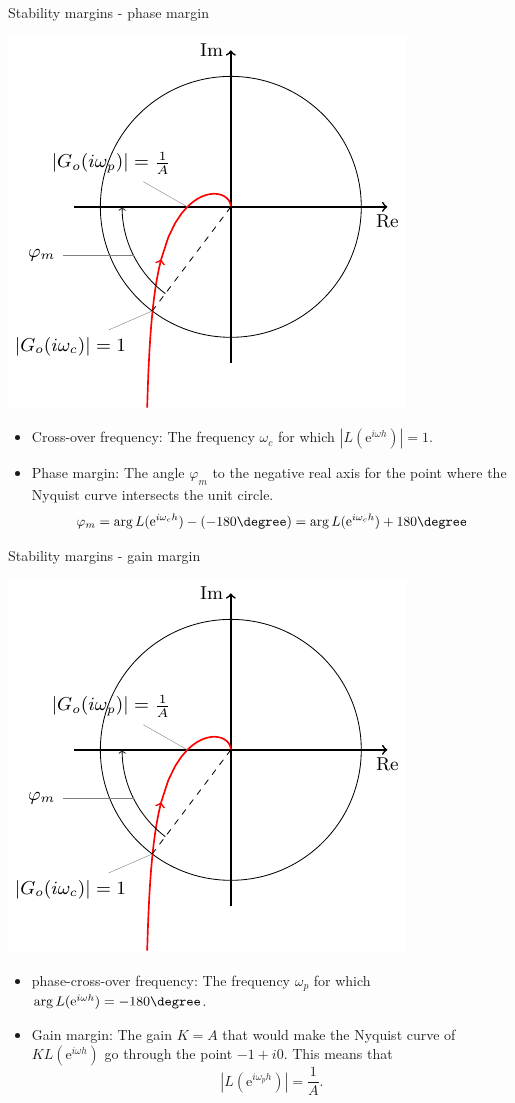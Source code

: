 \documentclass[presentation,aspectratio=169]{beamer}
\begin{document}
\begin{frame}[label={sec:org75821a8}]{Stability margins - phase margin}
\begin{center}
\includegraphics[width=0.38\linewidth]{../../figures/implane-nyquist-margins}
\end{center}
\begin{itemize}
\item Cross-over frequency: The frequency \(\omega_c\) for which \(|L(\mathrm{e}^{i\omega h})| = 1\).
\item Phase margin: The angle \(\varphi_m\) to the negative real axis for the point where the Nyquist curve intersects the unit circle. \[\varphi_m = \arg L(\mathrm{e}^{i\omega_c h}) - (-180\degree) = \arg L(\mathrm{e}^{i\omega_c h}) + 180\degree\]
\end{itemize}
\end{frame}

\begin{frame}[label={sec:orgb16d58a}]{Stability margins - gain margin}
\begin{center}
\includegraphics[width=0.34\linewidth]{../../figures/implane-nyquist-margins}
\end{center}
\begin{itemize}
\item phase-cross-over frequency: The frequency \(\omega_p\) for which \(\arg L(\mathrm{e}^{i\omega h}) = -180\degree\).
\item Gain margin: The gain \(K=A\) that would make the Nyquist curve of \(K L(\mathrm{e}^{i\omega h})\) go through the point \(-1 + i0\). This means that \[ |L(\mathrm{e}^{i\omega_p h})| = \frac{1}{A}. \]
\end{itemize}
\end{frame}
\end{document}
